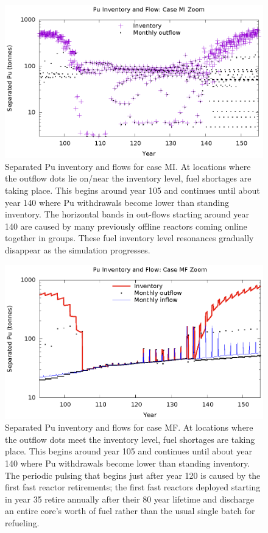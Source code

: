 \documentclass{style}
\begin{document}
\begin{figure}[!h]
    \centering
    \includegraphics[width=1.0\textwidth]{exp2/puinv-MI.eps}
    \caption[Separated Pu inventory and flow: Case MI Zoom]{
        Separated Pu inventory and flows for case MI.  At locations where the
        outflow dots lie on/near the inventory level, fuel shortages are
        taking place.  This begins around year 105 and continues until about
        year 140 where Pu withdrawals become lower than standing inventory.
        The horizontal bands in out-flows starting around year 140 are caused
        by many previously offline reactors coming online together in groups.
        These fuel inventory level resonances gradually disappear as the
        simulation progresses.
    }
    \label{fig:puinv-MI}
\end{figure}

\begin{figure}[!h]
    \centering
    \includegraphics[width=1.0\textwidth]{exp2/puinv-MF.eps}
    \caption[Separated Pu inventory and flow: Case MF Zoom]{
        Separated Pu inventory and flows for case MF.  At locations where the
        outflow dots meet the inventory level, fuel shortages are taking
        place.  This begins around year 105 and continues until about year 140
        where Pu withdrawals become lower than standing inventory.  The
        periodic pulsing that begins just after year 120 is caused by the
        first fast reactor retirements; the first fast reactors deployed starting in
        year 35 retire annually after their 80 year lifetime and discharge an entire core's
        worth of fuel rather than the usual single batch for refueling.
    }
    \label{fig:puinv-MF}
\end{figure}
\end{document}

